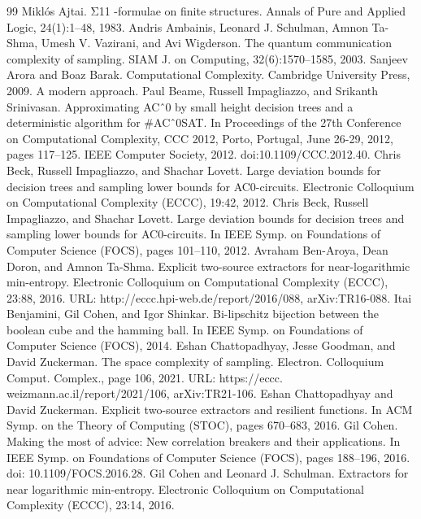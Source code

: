 \begin{thebibliography}{99}
 Miklós Ajtai. Σ11 -formulae on finite structures. Annals of Pure and Applied Logic, 24(1):1–48, 1983.
 Andris Ambainis, Leonard J. Schulman, Amnon Ta-Shma, Umesh V. Vazirani, and Avi Wigderson. The quantum communication complexity of sampling. SIAM J. on Computing, 32(6):1570–1585, 2003.
 Sanjeev Arora and Boaz Barak. Computational Complexity. Cambridge University Press, 2009. A modern approach.
 Paul Beame, Russell Impagliazzo, and Srikanth Srinivasan. Approximating ACˆ0 by small height decision trees and a deterministic algorithm for \#ACˆ0SAT. In Proceedings of the 27th Conference on Computational Complexity, CCC 2012, Porto, Portugal, June 26-29, 2012, pages 117–125. IEEE Computer Society, 2012. doi:10.1109/CCC.2012.40.
 Chris Beck, Russell Impagliazzo, and Shachar Lovett. Large deviation bounds for decision trees and sampling lower bounds for AC0-circuits. Electronic Colloquium on Computational Complexity (ECCC), 19:42, 2012.
 Chris Beck, Russell Impagliazzo, and Shachar Lovett. Large deviation bounds for decision trees and sampling lower bounds for AC0-circuits. In IEEE Symp. on Foundations of Computer Science (FOCS), pages 101–110, 2012.
 Avraham Ben-Aroya, Dean Doron, and Amnon Ta-Shma. Explicit two-source extractors for near-logarithmic min-entropy. Electronic Colloquium on Computational Complexity (ECCC), 23:88, 2016. URL: http://eccc.hpi-web.de/report/2016/088, arXiv:TR16-088.
 Itai Benjamini, Gil Cohen, and Igor Shinkar. Bi-lipschitz bijection between the boolean cube and the hamming ball. In IEEE Symp. on Foundations of Computer Science (FOCS), 2014.
 Eshan Chattopadhyay, Jesse Goodman, and David Zuckerman. The space complexity of sampling. Electron. Colloquium Comput. Complex., page 106, 2021. URL: https://eccc. weizmann.ac.il/report/2021/106, arXiv:TR21-106.
 Eshan Chattopadhyay and David Zuckerman. Explicit two-source extractors and resilient functions. In ACM Symp. on the Theory of Computing (STOC), pages 670–683, 2016.
 Gil Cohen. Making the most of advice: New correlation breakers and their applications. In IEEE Symp. on Foundations of Computer Science (FOCS), pages 188–196, 2016. doi: 10.1109/FOCS.2016.28.
 Gil Cohen and Leonard J. Schulman. Extractors for near logarithmic min-entropy. Electronic Colloquium on Computational Complexity (ECCC), 23:14, 2016.

\end{thebibliography}
